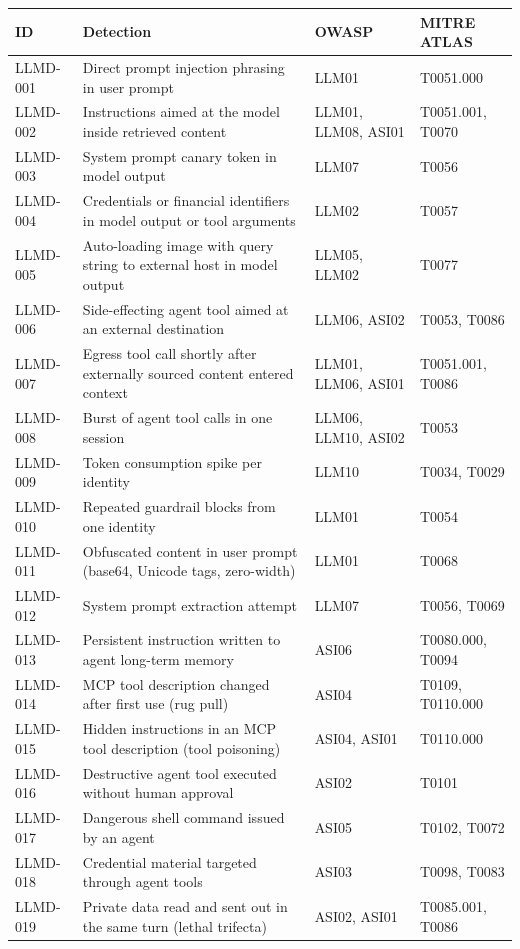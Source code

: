 \begin{tabular}{lp{7.2cm}ll}
\toprule
ID & Detection & OWASP & MITRE ATLAS \\
\midrule
LLMD-001 & Direct prompt injection phrasing in user prompt & LLM01 & T0051.000 \\
LLMD-002 & Instructions aimed at the model inside retrieved content & LLM01, LLM08, ASI01 & T0051.001, T0070 \\
LLMD-003 & System prompt canary token in model output & LLM07 & T0056 \\
LLMD-004 & Credentials or financial identifiers in model output or tool arguments & LLM02 & T0057 \\
LLMD-005 & Auto-loading image with query string to external host in model output & LLM05, LLM02 & T0077 \\
LLMD-006 & Side-effecting agent tool aimed at an external destination & LLM06, ASI02 & T0053, T0086 \\
LLMD-007 & Egress tool call shortly after externally sourced content entered context & LLM01, LLM06, ASI01 & T0051.001, T0086 \\
LLMD-008 & Burst of agent tool calls in one session & LLM06, LLM10, ASI02 & T0053 \\
LLMD-009 & Token consumption spike per identity & LLM10 & T0034, T0029 \\
LLMD-010 & Repeated guardrail blocks from one identity & LLM01 & T0054 \\
LLMD-011 & Obfuscated content in user prompt (base64, Unicode tags, zero-width) & LLM01 & T0068 \\
LLMD-012 & System prompt extraction attempt & LLM07 & T0056, T0069 \\
LLMD-013 & Persistent instruction written to agent long-term memory & ASI06 & T0080.000, T0094 \\
LLMD-014 & MCP tool description changed after first use (rug pull) & ASI04 & T0109, T0110.000 \\
LLMD-015 & Hidden instructions in an MCP tool description (tool poisoning) & ASI04, ASI01 & T0110.000 \\
LLMD-016 & Destructive agent tool executed without human approval & ASI02 & T0101 \\
LLMD-017 & Dangerous shell command issued by an agent & ASI05 & T0102, T0072 \\
LLMD-018 & Credential material targeted through agent tools & ASI03 & T0098, T0083 \\
LLMD-019 & Private data read and sent out in the same turn (lethal trifecta) & ASI02, ASI01 & T0085.001, T0086 \\

\end{tabular}
